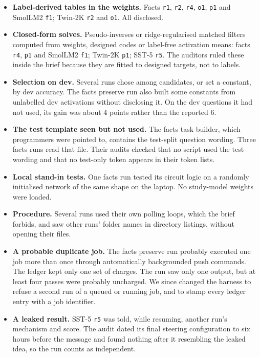 \begin{itemize}
  \item \textbf{Label-derived tables in the weights.} Facts \texttt{r1}, \texttt{r2}, \texttt{r4}, \texttt{o1}, \texttt{p1} and SmolLM2 \texttt{f1}; Twin-2K \texttt{r2} and \texttt{o1}. All disclosed.
  \item \textbf{Closed-form solves.} Pseudo-inverses or ridge-regularised matched filters computed from weights, designed codes or label-free activation means: facts \texttt{r4}, \texttt{p1} and SmolLM2 \texttt{f1}; Twin-2K \texttt{p1}; SST-5 \texttt{r5}. The auditors ruled these inside the brief because they are fitted to designed targets, not to labels.
  \item \textbf{Selection on dev.} Several runs chose among candidates, or set a constant, by dev accuracy. The facts preserve run also built some constants from unlabelled dev activations without disclosing it. On the dev questions it had not used, its gain was about 4 points rather than the reported 6.
  \item \textbf{The test template seen but not used.} The facts task builder, which programmers were pointed to, contains the test-split question wording. Three facts runs read that file. Their audits checked that no script used the test wording and that no test-only token appears in their token lists.
  \item \textbf{Local stand-in tests.} One facts run tested its circuit logic on a randomly initialised network of the same shape on the laptop. No study-model weights were loaded.
  \item \textbf{Procedure.} Several runs used their own polling loops, which the brief forbids, and saw other runs' folder names in directory listings, without opening their files.
  \item \textbf{A probable duplicate job.} The facts preserve run probably executed one job more than once through automatically backgrounded push commands. The ledger kept only one set of charges. The run saw only one output, but at least four passes were probably uncharged. We since changed the harness to refuse a second run of a queued or running job, and to stamp every ledger entry with a job identifier.
  \item \textbf{A leaked result.} SST-5 \texttt{r5} was told, while resuming, another run's mechanism and score. The audit dated its final steering configuration to six hours before the message and found nothing after it resembling the leaked idea, so the run counts as independent.
\end{itemize}

